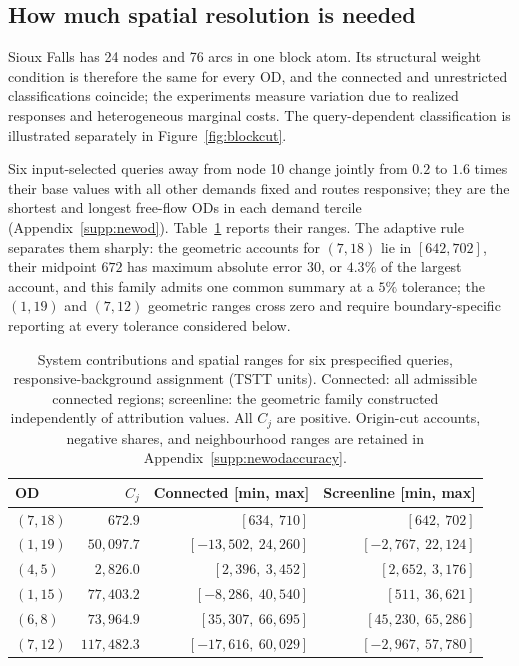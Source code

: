 \subsection{How much spatial resolution is needed}\label{sec:adequate}
Sioux Falls has 24 nodes and 76 arcs in one block atom. Its structural weight condition is therefore the same for every OD, and the connected and unrestricted classifications coincide; the experiments measure variation due to realized responses and heterogeneous marginal costs. The query-dependent classification is illustrated separately in Figure~\ref{fig:blockcut}.

Six input-selected queries away from node 10 change jointly from $0.2$ to $1.6$ times their base values with all other demands fixed and routes responsive; they are the shortest and longest free-flow ODs in each demand tercile (Appendix~\ref{supp:newod}). Table~\ref{tab:newod} reports their ranges. The adaptive rule separates them sharply: the geometric accounts for $(7,18)$ lie in $[642,702]$, their midpoint $672$ has maximum absolute error $30$, or $4.3\%$ of the largest account, and this family admits one common summary at a $5\%$ tolerance; the $(1,19)$ and $(7,12)$ geometric ranges cross zero and require boundary-specific reporting at every tolerance considered below.
\begin{table}[pos=htbp]
\footnotesize
\caption{System contributions and spatial ranges for six prespecified queries,
responsive-background assignment (TSTT units). Connected: all admissible connected regions;
screenline: the geometric family constructed independently of attribution
values. All $C_j$ are positive. Origin-cut accounts, negative shares, and
neighbourhood ranges are retained in Appendix~\ref{supp:newodaccuracy}.}
\label{tab:newod}
\small
\begin{tabular*}{\tblwidth}{@{\extracolsep{\fill}}lrrr}
\toprule
OD & $C_j$ & Connected [min, max] & Screenline [min, max]\\
\midrule
$(7,18)$ & $672.9$ & $[634{,}\ 710]$ & $[642{,}\ 702]$ \\
$(1,19)$ & $50{,}097.7$ & $[-13{,}502{,}\ 24{,}260]$ & $[-2{,}767{,}\ 22{,}124]$ \\
$(4,5)$ & $2{,}826.0$ & $[2{,}396{,}\ 3{,}452]$ & $[2{,}652{,}\ 3{,}176]$ \\
$(1,15)$ & $77{,}403.2$ & $[-8{,}286{,}\ 40{,}540]$ & $[511{,}\ 36{,}621]$ \\
$(6,8)$ & $73{,}964.9$ & $[35{,}307{,}\ 66{,}695]$ & $[45{,}230{,}\ 65{,}286]$ \\
$(7,12)$ & $117{,}482.3$ & $[-17{,}616{,}\ 60{,}029]$ & $[-2{,}967{,}\ 57{,}780]$ \\
\bottomrule
\end{tabular*}
\end{table}

